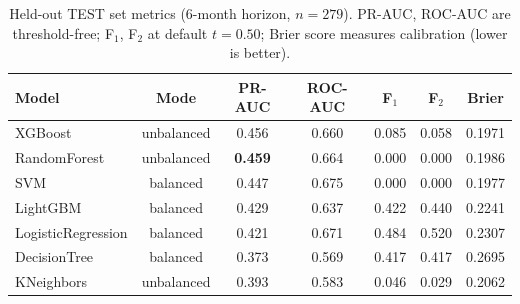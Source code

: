 \begin{table}[ht]
\centering
\caption{Held-out TEST set metrics (6-month horizon, $n=279$). PR-AUC, ROC-AUC are threshold-free; F$_1$, F$_2$ at default $t=0.50$; Brier score measures calibration (lower is better).}
\label{tab:step6_test_metrics}
\small
\begin{tabular}{l c c c c c c}
\toprule
Model & Mode & PR-AUC & ROC-AUC & F$_1$ & F$_2$ & Brier \\
\midrule
  XGBoost & unbalanced & 0.456 & 0.660 & 0.085 & 0.058 & 0.1971 \\
  RandomForest & unbalanced & \textbf{0.459} & 0.664 & 0.000 & 0.000 & 0.1986 \\
  SVM & balanced & 0.447 & 0.675 & 0.000 & 0.000 & 0.1977 \\
  LightGBM & balanced & 0.429 & 0.637 & 0.422 & 0.440 & 0.2241 \\
  LogisticRegression & balanced & 0.421 & 0.671 & 0.484 & 0.520 & 0.2307 \\
  DecisionTree & balanced & 0.373 & 0.569 & 0.417 & 0.417 & 0.2695 \\
  KNeighbors & unbalanced & 0.393 & 0.583 & 0.046 & 0.029 & 0.2062 \\
\bottomrule
\end{tabular}
\end{table}
